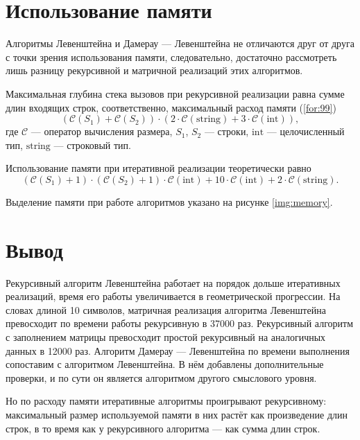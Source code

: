\section{Использование памяти}

Алгоритмы Левенштейна и Дамерау — Левенштейна не отличаются друг от друга с точки зрения использования памяти, следовательно, достаточно рассмотреть лишь разницу рекурсивной и матричной реализаций этих алгоритмов.

Максимальная глубина стека вызовов при рекурсивной реализации равна сумме длин входящих строк, соответственно, максимальный расход памяти (\ref{for:99})
\begin{equation}
(\mathcal{C}(S_1) + \mathcal{C}(S_2)) \cdot (2 \cdot \mathcal{C}\mathrm{(string)} + 3 \cdot \mathcal{C}\mathrm{(int)}),
\label{for:99}
\end{equation}
где $\mathcal{C}$ — оператор вычисления размера, $S_1$, $S_2$ — строки, $\mathrm{int}$ — целочисленный тип, $\mathrm{string}$ — строковый тип.

Использование памяти при итеративной реализации теоретически равно
\begin{equation}
(\mathcal{C}(S_1) + 1) \cdot (\mathcal{C}(S_2) + 1) \cdot \mathcal{C}\mathrm{(int)} + 10\cdot \mathcal{C}\mathrm{(int)} + 2 \cdot \mathcal{C}\mathrm{(string)}.
\end{equation}

Выделение памяти при работе алгоритмов указано на рисунке \ref{img:memory}.


\section*{Вывод}

Рекурсивный алгоритм Левенштейна работает на порядок дольше итеративных реализаций, время его работы увеличивается в геометрической прогрессии. На словах длиной 10 символов, матричная реализация алгоритма Левенштейна превосходит по времени работы рекурсивную в 37000 раз. Рекурсивный алгоритм с заполнением матрицы превосходит простой рекурсивный на аналогичных данных в 12000 раз. Алгоритм Дамерау — Левенштейна по времени выполнения сопоставим с алгоритмом Левенштейна. В нём добавлены дополнительные проверки, и по сути он является алгоритмом другого смыслового уровня.

Но по расходу памяти итеративные алгоритмы проигрывают рекурсивному: максимальный размер используемой памяти в них растёт как произведение длин строк, в то время как у рекурсивного алгоритма — как сумма длин строк.
